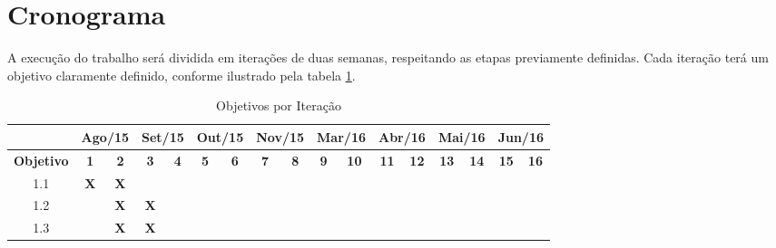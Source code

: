 \section{\label{section:schedule}Cronograma}

A execução do trabalho será dividida em iterações de duas semanas, respeitando
as etapas previamente definidas. Cada iteração terá um objetivo claramente
definido, conforme ilustrado pela tabela \ref{tab:cronograma}.

\begin{table}[htb!]
\centering
\caption{Objetivos por Iteração}
\label{tab:cronograma}
\begin{tabular}{c|c|c|c|c|c|c|c|c|c|c|c|c|c|c|c|c|}
\cline{2-17}
{\bf }                                & \multicolumn{2}{c|}{{\bf Ago/15}}             & \multicolumn{2}{c|}{{\bf Set/15}}             & \multicolumn{2}{c|}{{\bf Out/15}}             & \multicolumn{2}{c|}{{\bf Nov/15}}             & \multicolumn{2}{c|}{{\bf Mar/16}}             & \multicolumn{2}{c|}{{\bf Abr/16}} & \multicolumn{2}{c|}{{\bf Mai/16}} & \multicolumn{2}{c|}{{\bf Jun/16}} \\ \hline
\multicolumn{1}{|c|}{{\bf Objetivo}}  & {\bf 1}               & {\bf 2}               & {\bf 3}               & {\bf 4}               & {\bf 5}               & {\bf 6}               & {\bf 7}               & {\bf 8}               & {\bf 9}               & {\bf 10}              & {\bf 11}        & {\bf 12}        & {\bf 13}        & {\bf 14}        & {\bf 15}        & {\bf 16}        \\ \hline
\multicolumn{1}{|c|}{1.1}             & {\bf X}               & {\bf X}               &                       &                       &                       &                       &                       &                       &                       &                       &                 &                 &                 &                 &                 &                 \\ \hline
\multicolumn{1}{|c|}{1.2}             &                       & {\bf X}               & {\bf X}               &                       &                       &                       &                       &                       &                       &                       &                 &                 &                 &                 &                 &                 \\ \hline
\multicolumn{1}{|c|}{1.3}             &                       & {\bf X}               & {\bf X}               &                       &                       &                       &                       &                       &                       &                       &                 &                 &                 &                 &                 &                 \\ \hline

\end{tabular}
\end{table}
